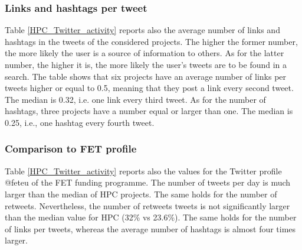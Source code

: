 \subsubsection{Links and hashtags per tweet}
Table \ref{HPC_Twitter_activity} reports also the average number of links and hashtags in the tweets of the considered projects. The higher the former number, the more likely the user is a source of information to others. As for the latter number, the higher it is, the more likely the user's tweets are to be found in a search. The table shows that six projects have an average number of links per tweets higher or equal to 0.5, meaning that they post a link every second tweet. The median is 0.32, i.e. one link every third tweet. As for the number of hashtags, three projects have a number equal or larger than one. The median is 0.25, i.e., one hashtag every fourth tweet.

\subsubsection{Comparison to FET profile}
Table \ref{HPC_Twitter_activity} reports also the values for the Twitter profile @fet\textunderscore eu of the FET funding programme. The number of tweets per day is much larger than the median of HPC projects. The same holds for the number of retweets.  Nevertheless, the number of retweets tweets is not significantly larger than the median value for HPC (32\% vs 23.6\%). The same holds for the number of links per tweets, whereas the average number of hashtags is almost four times larger.

